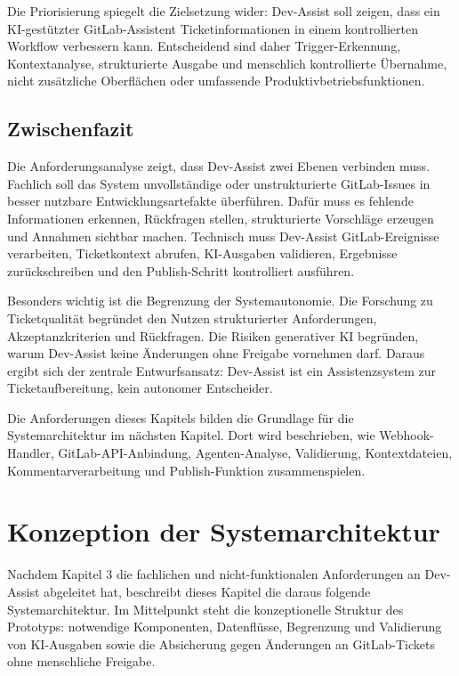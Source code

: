 \documentclass[12pt,a4paper,oneside]{scrreprt}
\begin{document}
Die Priorisierung spiegelt die Zielsetzung wider: Dev-Assist soll zeigen, dass ein KI-gestützter GitLab-Assistent Ticketinformationen in einem kontrollierten Workflow verbessern kann. Entscheidend sind daher Trigger-Erkennung, Kontextanalyse, strukturierte Ausgabe und menschlich kontrollierte Übernahme, nicht zusätzliche Oberflächen oder umfassende Produktivbetriebsfunktionen.

\section{Zwischenfazit}

Die Anforderungsanalyse zeigt, dass Dev-Assist zwei Ebenen verbinden muss. Fachlich soll das System unvollständige oder unstrukturierte GitLab-Issues in besser nutzbare Entwicklungsartefakte überführen. Dafür muss es fehlende Informationen erkennen, Rückfragen stellen, strukturierte Vorschläge erzeugen und Annahmen sichtbar machen. Technisch muss Dev-Assist GitLab-Ereignisse verarbeiten, Ticketkontext abrufen, KI-Ausgaben validieren, Ergebnisse zurückschreiben und den Publish-Schritt kontrolliert ausführen.

Besonders wichtig ist die Begrenzung der Systemautonomie. Die Forschung zu Ticketqualität begründet den Nutzen strukturierter Anforderungen, Akzeptanzkriterien und Rückfragen. Die Risiken generativer KI begründen, warum Dev-Assist keine Änderungen ohne Freigabe vornehmen darf. Daraus ergibt sich der zentrale Entwurfsansatz: Dev-Assist ist ein Assistenzsystem zur Ticketaufbereitung, kein autonomer Entscheider.

Die Anforderungen dieses Kapitels bilden die Grundlage für die Systemarchitektur im nächsten Kapitel. Dort wird beschrieben, wie Webhook-Handler, GitLab-API-Anbindung, Agenten-Analyse, Validierung, Kontextdateien, Kommentarverarbeitung und Publish-Funktion zusammenspielen.

\chapter{Konzeption der Systemarchitektur}

Nachdem Kapitel 3 die fachlichen und nicht-funktionalen Anforderungen an Dev-Assist abgeleitet hat, beschreibt dieses Kapitel die daraus folgende Systemarchitektur. Im Mittelpunkt steht die konzeptionelle Struktur des Prototyps: notwendige Komponenten, Datenflüsse, Begrenzung und Validierung von KI-Ausgaben sowie die Absicherung gegen Änderungen an GitLab-Tickets ohne menschliche Freigabe.
\end{document}
